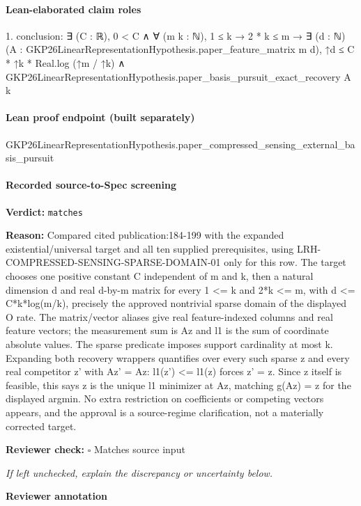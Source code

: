 \documentclass[10pt]{article}
\newcommand{\reviewerbox}{%
  \par\noindent\fbox{\parbox{0.96\linewidth}{\rule{0pt}{0.38in}}}\par
}
\newcommand{\reviewmatch}[1]{%
  \par\noindent\textbf{Reviewer check:} $\square$\; #1\par
  \noindent\emph{If left unchecked, explain the discrepancy or uncertainty below.}\par
}
\begin{document}
\paragraph{Lean-elaborated claim roles}\begin{ReviewVerbatim}
1. conclusion: ∃ (C : ℝ),
  0 < C ∧
    ∀ (m k : ℕ),
      1 ≤ k →
        2 * k ≤ m →
          ∃ (d : ℕ) (A : GKP26LinearRepresentationHypothesis.paper_feature_matrix m d),
            ↑d ≤ C * ↑k * Real.log (↑m / ↑k) ∧
              GKP26LinearRepresentationHypothesis.paper_basis_pursuit_exact_recovery A k
\end{ReviewVerbatim}

\paragraph{Lean proof endpoint (built separately)}\begin{ReviewVerbatim}
GKP26LinearRepresentationHypothesis.paper_compressed_sensing_external_basis_pursuit
\end{ReviewVerbatim}

\paragraph{Recorded source-to-Spec screening}
\textbf{Verdict:} \texttt{matches}
\\
{\raggedright
\textbf{Reason:} Compared cited publication:\allowbreak{}184-\allowbreak{}199 with the expanded existential/\allowbreak{}universal target and all ten supplied prerequisites, using LRH-\allowbreak{}COMPRESSED-\allowbreak{}SENSING-\allowbreak{}SPARSE-\allowbreak{}DOMAIN-\allowbreak{}01 only for this row.\allowbreak{} The target chooses one positive constant C independent of m and k, then a natural dimension d and real d-\allowbreak{}by-\allowbreak{}m matrix for every 1 <= k and 2*k <= m, with d <= C*k*log(m/\allowbreak{}k), precisely the approved nontrivial sparse domain of the displayed O rate.\allowbreak{} The matrix/\allowbreak{}vector aliases give real feature-\allowbreak{}indexed columns and real feature vectors;\allowbreak{} the measurement sum is Az and l1 is the sum of coordinate absolute values.\allowbreak{} The sparse predicate imposes support cardinality at most k.\allowbreak{} Expanding both recovery wrappers quantifies over every such sparse z and every real competitor z' with Az' = Az:\allowbreak{} l1(z') <= l1(z) forces z' = z.\allowbreak{} Since z itself is feasible, this says z is the unique l1 minimizer at Az, matching g(Az) = z for the displayed argmin.\allowbreak{} No extra restriction on coefficients or competing vectors appears, and the approval is a source-\allowbreak{}regime clarification, not a materially corrected target.\allowbreak{}
\par}
\reviewmatch{Matches source input}
\noindent\textbf{Reviewer annotation}\par
\reviewerbox
\clearpage
\hypertarget{source-claim-5da06a1a773efe05}{}
\end{document}
